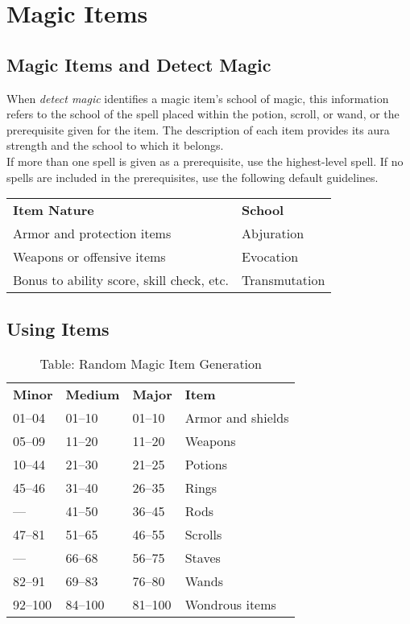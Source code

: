 \chapter{Magic Items}
\section{Magic Items and Detect Magic}

When \textit{detect magic} identifies a magic item's school of magic, this information refers to the school of the spell placed within the potion, scroll, or wand, or the prerequisite given for the item. The description of each item provides its aura strength and the school to which it belongs. \\

If more than one spell is given as a prerequisite, use the highest-level spell. If no spells are included in the prerequisites, use the following default guidelines.\\

\begin{tabular}{ll}
\textbf{Item Nature} & \textbf{School} \\
Armor and protection items & Abjuration\\
Weapons or offensive items & Evocation\\
Bonus to ability score, skill check, etc. & Transmutation\\
\end{tabular}

\section{Using Items}

\begin{table}[]
\sffamily
\caption{Table: Random Magic Item Generation}
\begin{tabular}{llll}
\textbf{Minor} & \textbf{Medium} & \textbf{Major} & \textbf{Item}\\
01--04 & 01--10 & 01--10 & Armor and shields \\
 05--09 & 11--20 & 11--20 & Weapons \\
 10--44 & 21--30 & 21--25 & Potions \\
 45--46 & 31--40 & 26--35 & Rings \\
 --- & 41--50 & 36--45 & Rods \\
 47--81 & 51--65 & 46--55 & Scrolls \\
 --- & 66--68 & 56--75 & Staves \\
 82--91 & 69--83 & 76--80 & Wands \\
 92--100 & 84--100 & 81--100 & Wondrous items\\
\end{tabular}
\end{table}
			
